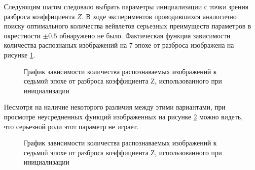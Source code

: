 \documentclass[utf8,usehyperref,14pt]{G7-32}
\begin{document}
Следующим шагом следовало выбрать параметры инициализации с точки зрения разброса коэффициента $Z$. В ходе экспериментов проводившихся аналогично поиску оптимального количества вейвлетов серьезных преимуществ параметров в окрестности $ \pm 0.5 $ обнаружено не было. Фактическая функция зависимости количества распознаных изображений на 7 эпохе от  разброса изображена на рисунке \ref{conwave_different_z_oneline}.
\begin{figure}[H]
  \caption{График зависимости количества распознаваемых изображений к седьмой эпохе от разброса коэффициента Z, использованного при инициализации}\label{conwave_different_z_oneline}
\end{figure}
Несмотря на наличие некоторого различия между этими вариантами, при просмотре неусредненных функций изображенных на рисунке \ref{conwave_different_z} можно видеть, что серьезной роли этот параметр не играет. 
\begin{figure}[H]
  \caption{График зависимости количества распознаваемых изображений к седьмой эпохе от разброса коэффициента Z, использованного при инициализации}\label{conwave_different_z}
\end{figure}
\end{document}
